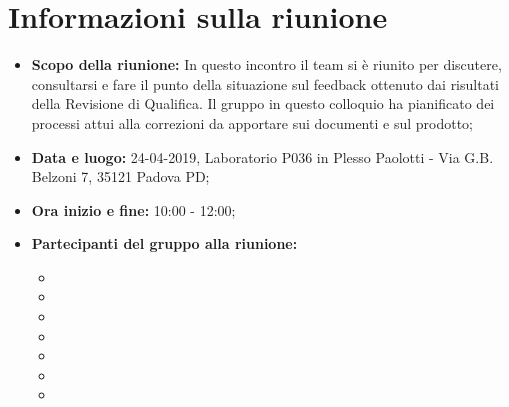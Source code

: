 \clearpage
\section{Informazioni sulla riunione}
\begin{itemize}
	\item \textbf {Scopo della riunione:} In questo incontro il team si è riunito per discutere, consultarsi e  fare il punto della situazione sul feedback ottenuto dai risultati della Revisione di Qualifica. Il gruppo in questo colloquio ha pianificato dei processi attui alla correzioni da apportare sui documenti e sul prodotto;
	\item \textbf {Data e luogo:} 24-04-2019, Laboratorio P036 in Plesso Paolotti - Via G.B. Belzoni 7, 35121 Padova PD;
	\item \textbf {Ora inizio e fine:} 10:00 - 12:00;
	\item \textbf {Partecipanti del gruppo alla riunione:} 
		 \begin{itemize}
			\item \sonia
			\item \pardeep
			\item \luca
			\item \matteo
			\item \alberto
			\item \alessandro
			\item \andrea
		\end{itemize}
\end{itemize}
